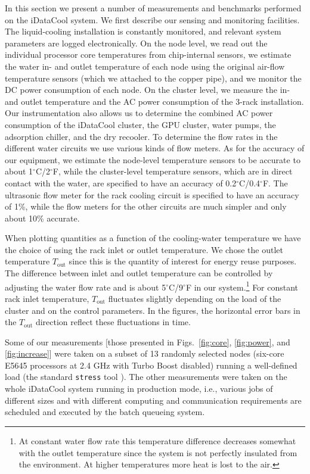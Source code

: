 In this section we present a number of measurements and benchmarks
performed on the iDataCool system.  We first describe our sensing and
monitoring facilities.  The liquid-cooling installation is constantly
monitored, and relevant system parameters are logged electronically.
On the node level, we read out the individual processor core
temperatures from chip-internal sensors, we estimate the water in- and
outlet temperature of each node using the original air-flow
temperature sensors (which we attached to the copper pipe), and we
monitor the DC power consumption of each node.  On the cluster level,
we measure the in- and outlet temperature and the AC power consumption
of the 3-rack installation.  Our instrumentation also allows us to
determine the combined AC power consumption of the iDataCool cluster,
the GPU cluster, water pumps, the adsorption chiller, and the dry
recooler.  To determine the flow rates in the different water circuits
we use various kinds of flow meters.  As for the accuracy of our
equipment, we estimate the node-level temperature sensors to be
accurate to about 1$^\circ$C/2$^\circ$F, while the cluster-level
temperature sensors, which are in direct contact with the water, are
specified to have an accuracy of 0.2$^\circ$C/0.4$^\circ$F.  The
ultrasonic flow meter for the rack cooling circuit is specified to
have an accuracy of 1\%, while the flow meters for the other circuits
are much simpler and only about 10\% accurate. 

When plotting quantities as a function of the cooling-water
temperature we have the choice of using the rack inlet or outlet
temperature.  We chose the outlet temperature $T_\text{out}$ since
this is the quantity of interest for energy reuse purposes.  The
difference between inlet and outlet temperature can be controlled by
adjusting the water flow rate and is about 5$^\circ$C/9$^\circ$F in
our system.\footnote{At constant water flow rate this temperature
  difference decreases somewhat with the outlet temperature since the
  system is not perfectly insulated from the environment.  At higher
  temperatures more heat is lost to the air.}  For constant rack inlet
temperature, $T_\text{out}$ fluctuates slightly depending on the load
of the cluster and on the control parameters.  In the figures, the
horizontal error bars in the $T_\text{out}$ direction reflect these
fluctuations in time.

Some of our measurements [those presented in Figs.~\ref{fig:core},
\ref{fig:power}, and \ref{fig:increase}] were taken on a subset of 13
randomly selected nodes (six-core E5645 processors at 2.4 GHz with
Turbo Boost disabled) running a well-defined load (the standard
\texttt{stress} tool \cite{stress}).  The other measurements were
taken on the whole iDataCool system running in production mode, i.e.,
various jobs of different sizes and with different computing and
communication requirements are scheduled and executed by the batch
queueing system.


